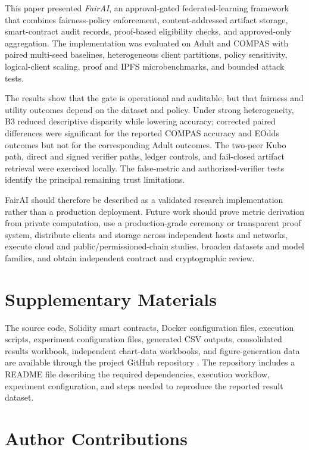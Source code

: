 \documentclass[futureinternet,article,submit,pdftex,moreauthors]{Definitions/mdpi}
\begin{document}
This paper presented \textit{FairAI}, an approval-gated federated-learning framework that combines fairness-policy enforcement, content-addressed artifact storage, smart-contract audit records, proof-based eligibility checks, and approved-only aggregation. The implementation was evaluated on Adult and COMPAS with paired multi-seed baselines, heterogeneous client partitions, policy sensitivity, logical-client scaling, proof and IPFS microbenchmarks, and bounded attack tests.

The results show that the gate is operational and auditable, but that fairness and utility outcomes depend on the dataset and policy. Under strong heterogeneity, B3 reduced descriptive disparity while lowering accuracy; corrected paired differences were significant for the reported COMPAS accuracy and EOdds outcomes but not for the corresponding Adult outcomes. The two-peer Kubo path, direct and signed verifier paths, ledger controls, and fail-closed artifact retrieval were exercised locally. The false-metric and authorized-verifier tests identify the principal remaining trust limitations.

FairAI should therefore be described as a validated research implementation rather than a production deployment. Future work should prove metric derivation from private computation, use a production-grade ceremony or transparent proof system, distribute clients and storage across independent hosts and networks, execute cloud and public/permissioned-chain studies, broaden datasets and model families, and obtain independent contract and cryptographic review.

\section*{Supplementary Materials}

The source code, Solidity smart contracts, Docker configuration files, execution scripts, experiment configuration files, generated CSV outputs, consolidated results workbook, independent chart-data workbooks, and figure-generation data are available through the project GitHub repository \cite{fairai_mvp_2026}. The repository includes a README file describing the required dependencies, execution workflow, experiment configuration, and steps needed to reproduce the reported result dataset.

\section*{Author Contributions}
\end{document}

